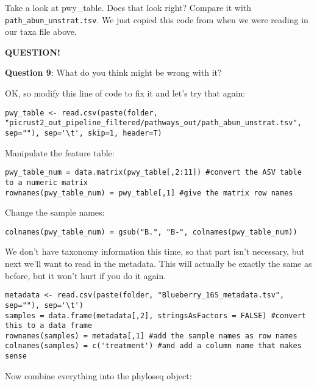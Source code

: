 \documentclass[
]{book}
\newenvironment{bluebox}{
  \definecolor{shadecolor}{RGB}{172, 210, 237}
  \color{white}
  \begin{shaded}}
 {\end{shaded}}
\begin{document}
Take a look at pwy\_table. Does that look right? Compare it with \texttt{path\_abun\_unstrat.tsv}. We just copied this code from when we were reading in our taxa file above.

\begin{bluebox}

\begin{center}
\textbf{QUESTION!}

\end{center}

\textbf{Question 9}: What do you think might be wrong with it?

\end{bluebox}

OK, so modify this line of code to fix it and let's try that again:

\begin{verbatim}
pwy_table <- read.csv(paste(folder, "picrust2_out_pipeline_filtered/pathways_out/path_abun_unstrat.tsv", sep=""), sep='\t', skip=1, header=T)
\end{verbatim}

Manipulate the feature table:

\begin{verbatim}
pwy_table_num = data.matrix(pwy_table[,2:11]) #convert the ASV table to a numeric matrix
rownames(pwy_table_num) = pwy_table[,1] #give the matrix row names
\end{verbatim}

Change the sample names:

\begin{verbatim}
colnames(pwy_table_num) = gsub("B.", "B-", colnames(pwy_table_num))
\end{verbatim}

We don't have taxonomy information this time, so that part isn't necessary, but next we'll want to read in the metadata. This will actually be exactly the same as before, but it won't hurt if you do it again.

\begin{verbatim}
metadata <- read.csv(paste(folder, "Blueberry_16S_metadata.tsv", sep=""), sep='\t')
samples = data.frame(metadata[,2], stringsAsFactors = FALSE) #convert this to a data frame
rownames(samples) = metadata[,1] #add the sample names as row names
colnames(samples) = c('treatment') #and add a column name that makes sense
\end{verbatim}

Now combine everything into the phyloseq object:
\end{document}

